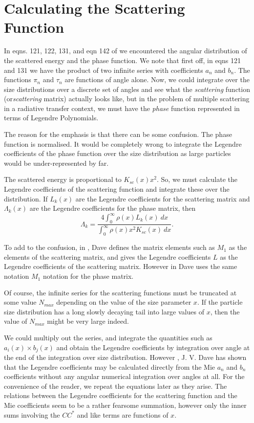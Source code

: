 \documentclass[12pt]{article}
\begin{document}
\section{ Calculating the Scattering Function}

In eqns. 121, 122, 131, and eqn 142 of \cite{EMScatt:Miebib} we encountered the angular
 distribution of the scattered energy and the phase function.
We note that first off, in eqns 121 and 131 we have the product of two 
infinite series with  coefficients $a_n$ and $b_n$.
The functions $\pi_n$ and $\tau_n$ are functions of angle alone.
 Now, we could integrate over the size distributions
over a discrete set of angles and see what the {\it scattering} function
 (or{\it  scattering} matrix) actually looks like, but in
  the problem of 
multiple scattering in a radiative transfer context,
  we must have the {\it phase } function represented in
 terms of Legendre Polynomials. 

The reason for the emphasis is that there can be some confusion. The phase function
is normalised. It would be completely wrong to integrate the Legendre
coefficients of the phase function over the size distribution as large
 particles would be under-represented by far. 

The scattered energy is proportional to $K_{sc}(x) x^2$. So, we must
calculate the Legendre coefficients of the scattering function and integrate these
over the distribution. If $L_k(x)$ are the Legendre coefficients for the
 scattering matrix
and $\Lambda_k(x)$ are the Legendre coefficients for the phase matrix, then
\begin{equation}
\Lambda_k=\frac{ 
4\int_0^\infty \rho(x) L_k(x) \> dx }{
\int_0^\infty \rho(x) x^2 K_{sc}(x) \> dx }.
\end{equation}


To add to the confusion,
in \cite{Dave1:Miebib}, Dave defines the matrix elements such as $M_1$ as
the elements of the scattering matrix, and gives the Legendre coefficients $L$
as the Legendre coefficients of the scattering matrix. However in \cite{Dave2:Miebib}
Dave uses the same notation $M_1$ notation for the phase matrix.


Of course, the infinite series for the  scattering functions must 
be truncated at some value 
$N_{max}$ depending on the value 
of the size parameter $x$. If the particle size distribution 
has a long slowly decaying tail into large values of  $x$, then the 
value of $N_{max}$ might be very large indeed.


We could multiply out the series, and integrate the quantities such as
$a_i(x) \times b_j(x)$ and obtain the Legendre coefficients by integration over angle
at the end of the integration over size distribution.
However \cite{Dave1:Miebib}, J. V. Dave has 
shown that the Legendre coefficients
 may be calculated directly from the Mie $a_n$ and $b_n$ coefficients 
without any angular numerical integration over angles 
 at all. For the convenience of the reader, we repeat the
 equations later as they arise.
The relations between the Legendre coefficients for 
the scattering function and the Mie coefficients
 seem to be a rather fearsome summation, however only the inner
sums  involving the $C C^*$ and like terms are functions of $x$.
\end{document}

